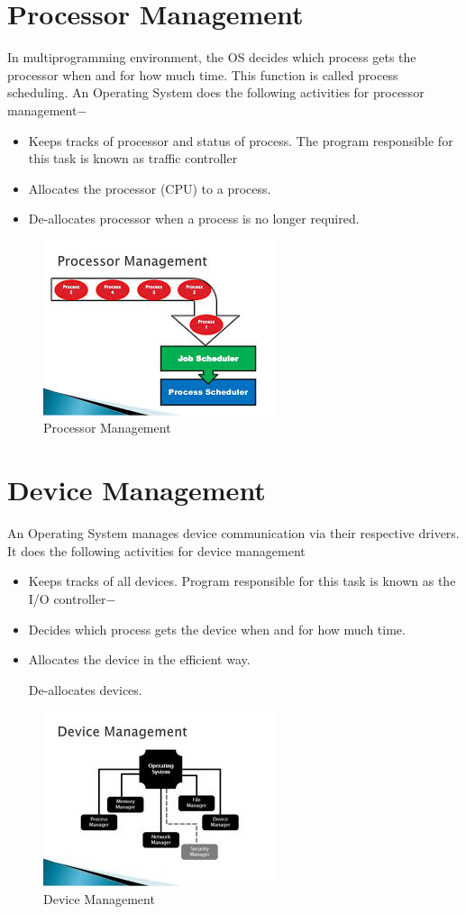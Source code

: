 \documentclass[a4paper,10pt]{article}
\begin{document}
 \section{Processor Management}
 In multiprogramming environment, the OS decides which process gets the processor when and for how much time. This function is called process scheduling. An Operating System does the following activities for processor management$-$
  \begin{itemize}
    \item Keeps tracks of processor and status of process. The program responsible for this task is known as traffic controller
    \item Allocates the processor (CPU) to a process.
    \item De-allocates processor when a process is no longer required.
  \end{itemize}
  \begin{figure}[h]
  \centering
\includegraphics{pm}
\caption{Processor Management}
\end{figure}

  \newpage
  \section{Device Management}
An Operating System manages device communication via their respective drivers. It does the following activities for device management
 \begin{itemize}
   \item Keeps tracks of all devices. Program responsible for this task is known as the I/O controller$-$
   \item Decides which process gets the device when and for how much time.
   \item Allocates the device in the efficient way.

De-allocates devices.
 \end{itemize}
 \begin{figure}[h]
 \centering
\includegraphics{dm}
\caption{Device Management}
\end{figure}
 
\end{document}
